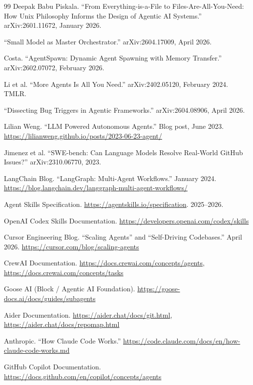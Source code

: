 \documentclass[11pt,a4paper]{article}
\begin{document}
\begin{thebibliography}{99}
Deepak Babu Piskala.
``From Everything-is-a-File to Files-Are-All-You-Need: How Unix Philosophy
Informs the Design of Agentic AI Systems.''
arXiv:2601.11672, January 2026.

``Small Model as Master Orchestrator.''
arXiv:2604.17009, April 2026.

Costa.
``AgentSpawn: Dynamic Agent Spawning with Memory Transfer.''
arXiv:2602.07072, February 2026.

Li et al.
``More Agents Is All You Need.''
arXiv:2402.05120, February 2024.  TMLR.

``Dissecting Bug Triggers in Agentic Frameworks.''
arXiv:2604.08906, April 2026.

Lilian Weng.
``LLM Powered Autonomous Agents.''
Blog post, June 2023.
\url{https://lilianweng.github.io/posts/2023-06-23-agent/}

Jimenez et al.
``SWE-bench: Can Language Models Resolve Real-World GitHub Issues?''
arXiv:2310.06770, 2023.

LangChain Blog.
``LangGraph: Multi-Agent Workflows.''  January 2024.
\url{https://blog.langchain.dev/langgraph-multi-agent-workflows/}

Agent Skills Specification.
\url{https://agentskills.io/specification}.  2025--2026.

OpenAI Codex Skills Documentation.
\url{https://developers.openai.com/codex/skills}

Cursor Engineering Blog.
``Scaling Agents'' and ``Self-Driving Codebases.''
April 2026.
\url{https://cursor.com/blog/scaling-agents}

CrewAI Documentation.
\url{https://docs.crewai.com/concepts/agents}, \url{https://docs.crewai.com/concepts/tasks}

Goose AI (Block / Agentic AI Foundation).
\url{https://goose-docs.ai/docs/guides/subagents}

Aider Documentation.
\url{https://aider.chat/docs/git.html}, \url{https://aider.chat/docs/repomap.html}

Anthropic.  ``How Claude Code Works.''
\url{https://code.claude.com/docs/en/how-claude-code-works.md}

GitHub Copilot Documentation.
\url{https://docs.github.com/en/copilot/concepts/agents}

\end{thebibliography}
\end{document}
